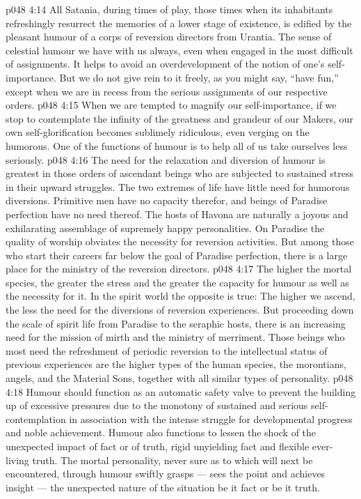 \vs p048 4:14 \pc All Satania, during times of play, those times when its inhabitants refreshingly resurrect the memories of a lower stage of existence, is edified by the pleasant humour of a corps of reversion directors from Urantia. The sense of celestial humour we have with us always, even when engaged in the most difficult of assignments. It helps to avoid an overdevelopment of the notion of one’s self\hyp{}importance. But we do not give rein to it freely, as you might say, “have fun,” except when we are in recess from the serious assignments of our respective orders.
\vs p048 4:15 When we are tempted to magnify our self\hyp{}importance, if we stop to contemplate the infinity of the greatness and grandeur of our Makers, our own self\hyp{}glorification becomes sublimely ridiculous, even verging on the humorous. One of the functions of humour is to help all of us take ourselves less seriously. 
\vs p048 4:16 \pc The need for the relaxation and diversion of humour is greatest in those orders of ascendant beings who are subjected to sustained stress in their upward struggles. The two extremes of life have little need for humorous diversions. Primitive men have no capacity therefor, and beings of Paradise perfection have no need thereof. The hosts of Havona are naturally a joyous and exhilarating assemblage of supremely happy personalities. On Paradise the quality of worship obviates the necessity for reversion activities. But among those who start their careers far below the goal of Paradise perfection, there is a large place for the ministry of the reversion directors.
\vs p048 4:17 The higher the mortal species, the greater the stress and the greater the capacity for humour as well as the necessity for it. In the spirit world the opposite is true: The higher we ascend, the less the need for the diversions of reversion experiences. But proceeding down the scale of spirit life from Paradise to the seraphic hosts, there is an increasing need for the mission of mirth and the ministry of merriment. Those beings who most need the refreshment of periodic reversion to the intellectual status of previous experiences are the higher types of the human species, the morontians, angels, and the Material Sons, together with all similar types of personality.
\vs p048 4:18 Humour should function as an automatic safety valve to prevent the building up of excessive pressures due to the monotony of sustained and serious self\hyp{}contemplation in association with the intense struggle for developmental progress and noble achievement. Humour also functions to lessen the shock of the unexpected impact of fact or of truth, rigid unyielding fact and flexible ever\hyp{}living truth. The mortal personality, never sure as to which will next be encountered, through humour swiftly grasps --- sees the point and achieves insight --- the unexpected nature of the situation be it fact or be it truth.
